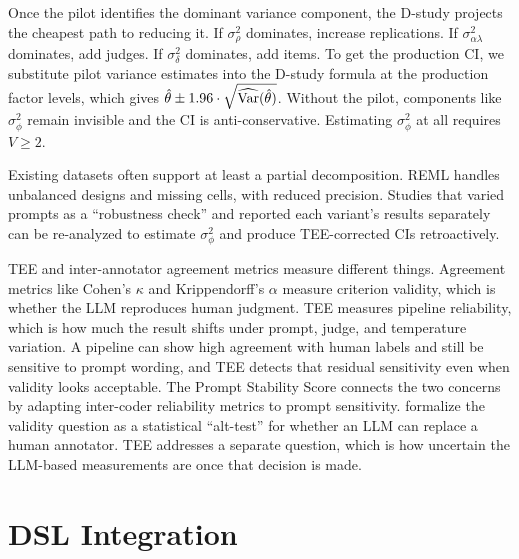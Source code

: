 Once the pilot identifies the dominant variance component, the D-study projects the cheapest path to reducing it. If $\sigma^2_\rho$ dominates, increase replications. If $\sigma^2_{\alpha\lambda}$ dominates, add judges. If $\sigma^2_\delta$ dominates, add items. To get the production CI, we substitute pilot variance estimates into the D-study formula at the production factor levels, which gives $\hat{\theta} \pm 1.96 \cdot \sqrt{\widehat{\operatorname{Var}}(\hat{\theta})}$. Without the pilot, components like $\sigma^2_\phi$ remain invisible and the CI is anti-conservative. Estimating $\sigma^2_\phi$ at all requires $V \geq 2$.

Existing datasets often support at least a partial decomposition. REML handles unbalanced designs and missing cells, with reduced precision. Studies that varied prompts as a ``robustness check'' and reported each variant's results separately can be re-analyzed to estimate $\sigma^2_\phi$ and produce TEE-corrected CIs retroactively.

TEE and inter-annotator agreement metrics measure different things. Agreement metrics like Cohen's $\kappa$ and Krippendorff's $\alpha$ measure criterion validity, which is whether the LLM reproduces human judgment. TEE measures pipeline reliability, which is how much the result shifts under prompt, judge, and temperature variation. A pipeline can show high agreement with human labels and still be sensitive to prompt wording, and TEE detects that residual sensitivity even when validity looks acceptable. The Prompt Stability Score \citep{barrie2024pss} connects the two concerns by adapting inter-coder reliability metrics to prompt sensitivity. \citet{calderon2025alttest} formalize the validity question as a statistical ``alt-test'' for whether an LLM can replace a human annotator. TEE addresses a separate question, which is how uncertain the LLM-based measurements are once that decision is made.



\clearpage

\section{DSL Integration}
\label{si:dsl}

